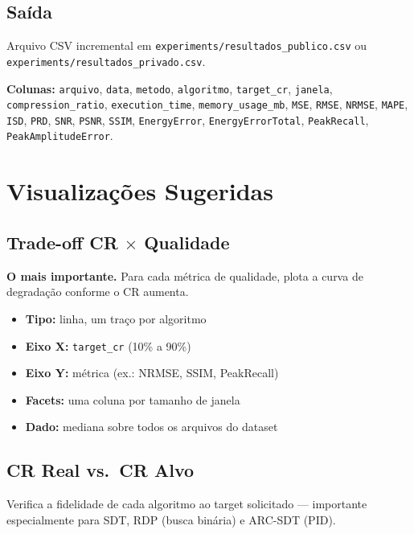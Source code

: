\documentclass[12pt, a4paper]{article}
\begin{document}
\subsection{Saída}

Arquivo CSV incremental em \texttt{experiments/resultados\_publico.csv} ou \texttt{experiments/resultados\_privado.csv}.

\textbf{Colunas:} \texttt{arquivo}, \texttt{data}, \texttt{metodo}, \texttt{algoritmo}, \texttt{target\_cr}, \texttt{janela}, \texttt{compression\_ratio}, \texttt{execution\_time}, \texttt{memory\_usage\_mb}, \texttt{MSE}, \texttt{RMSE}, \texttt{NRMSE}, \texttt{MAPE}, \texttt{ISD}, \texttt{PRD}, \texttt{SNR}, \texttt{PSNR}, \texttt{SSIM}, \texttt{EnergyError}, \texttt{EnergyErrorTotal}, \texttt{PeakRecall}, \texttt{PeakAmplitudeError}.

\section{Visualizações Sugeridas}

\subsection{Trade-off CR $\times$ Qualidade}

\textbf{O mais importante.} Para cada métrica de qualidade, plota a curva de degradação conforme o CR aumenta.

\begin{itemize}
    \item \textbf{Tipo:} linha, um traço por algoritmo
    \item \textbf{Eixo X:} \texttt{target\_cr} (10\% a 90\%)
    \item \textbf{Eixo Y:} métrica (ex.: NRMSE, SSIM, PeakRecall)
    \item \textbf{Facets:} uma coluna por tamanho de janela
    \item \textbf{Dado:} mediana sobre todos os arquivos do dataset
\end{itemize}

\subsection{CR Real vs.\ CR Alvo}

Verifica a fidelidade de cada algoritmo ao target solicitado — importante especialmente para SDT, RDP (busca binária) e ARC-SDT (PID).
\end{document}
